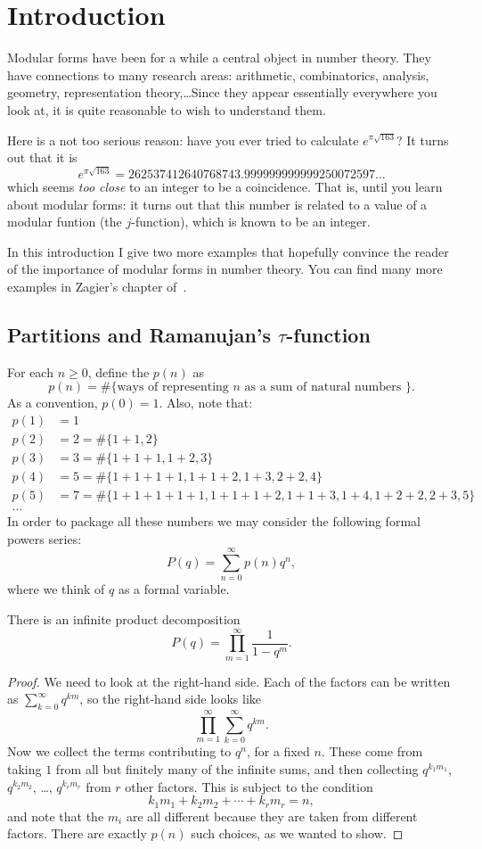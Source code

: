 
\section{Introduction}
\label{sec:introduction}
Modular forms have been for a while a central object in number theory. They have connections to many research areas: arithmetic, combinatorics, analysis, geometry, representation theory,\ldots Since they appear essentially everywhere you look at, it is quite reasonable to wish to understand them.

Here is a not too serious reason: have you ever tried to calculate $e^{\pi\sqrt{163}}$? It turns out that it is
\[
e^{\pi\sqrt{163}} = 262537412640768743.999999999999250072597\ldots
\]
which seems \emph{too close} to an integer to be a coincidence. That is, until you learn about modular forms: it turns out that this number is related to a value of a modular funtion (the $j$-function), which is known to be an integer.

In this introduction I give two more examples that hopefully convince the reader of the importance of modular forms in number theory. You can find many more examples in Zagier's chapter of~\cite{book123modforms}.

\subsection{Partitions and Ramanujan's \texorpdfstring{$\tau$}{tau}-function}
For each $n\geq 0$, define the  $p(n)$ as
\[
p(n)=\#\{\text{ways of representing $n$ as a sum of natural numbers }\}.
\]
As a convention, $p(0)=1$. Also, note that:
\begin{align*}
p(1) &= 1\\
p(2) &= 2 = \#\{1+1,2\}\\
p(3) &= 3 = \#\{1+1+1, 1+2, 3\}\\
p(4) &= 5 = \#\{1+1+1+1,1+1+2,1+3,2+2,4\}\\
p(5) &= 7 = \#\{1+1+1+1+1,1+1+1+2,1+1+3,1+4,1+2+2,2+3,5\}\\
\ldots&
\end{align*}
In order to package all these numbers we may consider the following formal powers series:
\[
P(q) = \sum_{n=0}^\infty p(n)q^n,
\]
where we think of $q$ as a formal variable.
\begin{lemma}
  There is an infinite product decomposition
\[
P(q) = \prod_{m=1}^\infty \frac{1}{1-q^m}.
\]
\end{lemma}
\begin{proof}
  We need to look at the right-hand side. Each of the factors can be written as
$\sum_{k=0}^\infty q^{km}$, so the right-hand side looks like
\[
\prod_{m=1}^\infty\sum_{k=0}^\infty q^{km}.
\]
Now we collect the terms contributing to $q^n$, for a fixed $n$. These come from taking $1$ from all but finitely many of the infinite sums, and then collecting $q^{k_1m_1}$, $q^{k_2m_2}$, \ldots, $q^{k_rm_r}$ from $r$ other factors. This is subject to the condition
\[
k_1m_1+k_2m_2+\cdots+k_rm_r = n,
\]
and note that the $m_i$ are all different because they are taken from different factors. There are exactly $p(n)$ such choices, as we wanted to show.
\end{proof}

